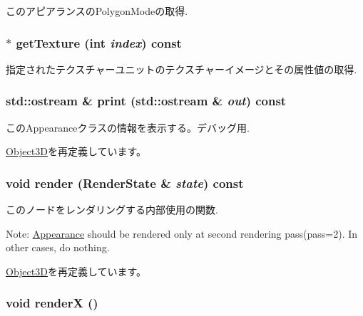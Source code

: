 このアピアランスのPolygonModeの取得. \hypertarget{classm3g_1_1Appearance_987cc21bd78d0e4e664da717479bdd57}{
\subsubsection[{getTexture}]{ $\ast$ getTexture (int {\em index}) const}}
\label{classm3g_1_1Appearance_987cc21bd78d0e4e664da717479bdd57}


指定されたテクスチャーユニットのテクスチャーイメージとその属性値の取得. \hypertarget{classm3g_1_1Appearance_6fea17fa1532df3794f8cb39cb4f911f}{
\subsubsection[{print}]{\setlength{\rightskip}{0pt plus 5cm}std::ostream \& print (std::ostream \& {\em out}) const}}
\label{classm3g_1_1Appearance_6fea17fa1532df3794f8cb39cb4f911f}


このAppearanceクラスの情報を表示する。デバッグ用. 

\hyperlink{classm3g_1_1Object3D_6fea17fa1532df3794f8cb39cb4f911f}{Object3D}を再定義しています。\hypertarget{classm3g_1_1Appearance_8babc8a79b78615da51161e94029eea9}{
\subsubsection[{render}]{\setlength{\rightskip}{0pt plus 5cm}void render ({\bf RenderState} \& {\em state}) const}}
\label{classm3g_1_1Appearance_8babc8a79b78615da51161e94029eea9}


このノードをレンダリングする内部使用の関数.

Note: \hyperlink{classm3g_1_1Appearance}{Appearance} should be rendered only at second rendering pass(pass=2). In other cases, do nothing. 

\hyperlink{classm3g_1_1Object3D_8babc8a79b78615da51161e94029eea9}{Object3D}を再定義しています。\hypertarget{classm3g_1_1Appearance_443a7a301f77f625335ecc06d13bad06}{
\subsubsection[{renderX}]{\setlength{\rightskip}{0pt plus 5cm}void renderX ()}}
\label{classm3g_1_1Appearance_443a7a301f77f625335ecc06d13bad06}


